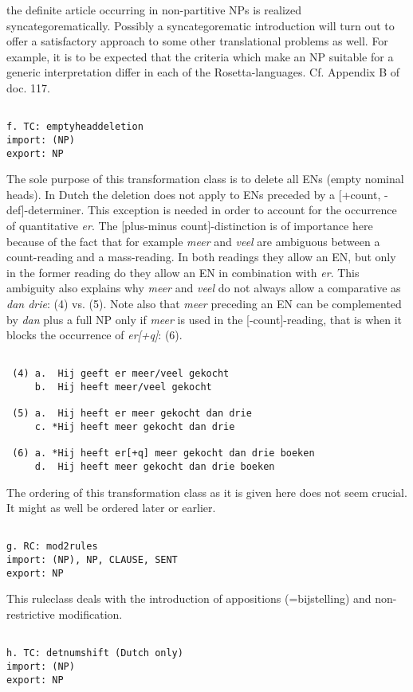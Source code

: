 the definite article occurring in non-partitive NPs is realized
syncategorematically. Possibly a syncategorematic introduction will turn out to
offer a satisfactory approach to some other translational problems as well. For
example, it is to be expected that the criteria which make an NP suitable for a
generic interpretation differ in each of the Rosetta-languages. Cf. 
Appendix B of doc. 117.
\begin{verbatim}

f. TC: emptyheaddeletion
import: (NP)
export: NP
\end{verbatim}
The sole purpose of this transformation class is to delete all ENs (empty
nominal heads). In Dutch the deletion does not apply to ENs
preceded by a [+count, -def]-determiner. This exception is needed
in order to account for the occurrence of quantitative {\em er}. The
[plus-minus count]-distinction is 
of importance here because of the fact that for
example {\em meer} and {\em veel} are ambiguous between a count-reading and a 
mass-reading. In both readings they allow an EN, but only in the former
reading do they allow an EN in combination 
with {\em er}. This ambiguity also explains why {\em meer} and {\em veel} do not always
allow a comparative as {\em dan drie}: (4) vs. (5). 
Note also that {\em meer} preceding an EN
can be
complemented by {\em dan} plus a full NP only if {\em meer} is used in the 
[-count]-reading, that is when it blocks the occurrence of {\em er[+q]}: (6).
\begin{verbatim}

 (4) a.  Hij geeft er meer/veel gekocht
     b.  Hij heeft meer/veel gekocht 

 (5) a.  Hij heeft er meer gekocht dan drie
     c. *Hij heeft meer gekocht dan drie

 (6) a. *Hij heeft er[+q] meer gekocht dan drie boeken 
     d.  Hij heeft meer gekocht dan drie boeken 

\end{verbatim}
The ordering of this transformation class 
as it is given here does not seem crucial. It
might as well be ordered later or earlier.
\begin{verbatim}

g. RC: mod2rules 
import: (NP), NP, CLAUSE, SENT
export: NP 
\end{verbatim}
This ruleclass deals with the 
introduction of appositions (=bijstelling) and non-restrictive 
modification.
\begin{verbatim}

h. TC: detnumshift (Dutch only)
import: (NP)
export: NP
\end{verbatim}
